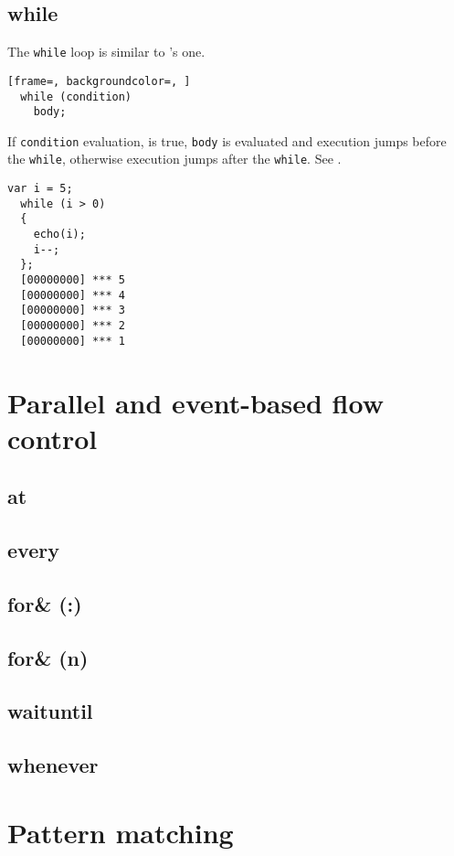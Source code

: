 \documentclass[openright,twoside,12pt]{report}
\begin{document}
\subsection{while}

The \lstinline|while| loop is similar to \C's one.

\begin{lstlisting}[frame=, backgroundcolor=, ]
  while (condition)
    body;
\end{lstlisting}

If \lstinline|condition| evaluation, is true, \lstinline|body| is
evaluated and execution jumps before the \lstinline|while|, otherwise execution
jumps after the \lstinline|while|. See .

\begin{lstlisting}[caption=The \lstinline|while| construct, label=lst:while,
  float=\floatpos]
  var i = 5;
  while (i > 0)
  {
    echo(i);
    i--;
  };
  [00000000] *** 5
  [00000000] *** 4
  [00000000] *** 3
  [00000000] *** 2
  [00000000] *** 1
\end{lstlisting}

\FloatBarrier
\section{Parallel and event-based flow control}

\subsection{at}
\subsection{every}
\subsection{for\& (:)}
\subsection{for\& (n)}
\subsection{waituntil}
\subsection{whenever}

\FloatBarrier
\section{Pattern matching}
\FloatBarrier
\end{document}
